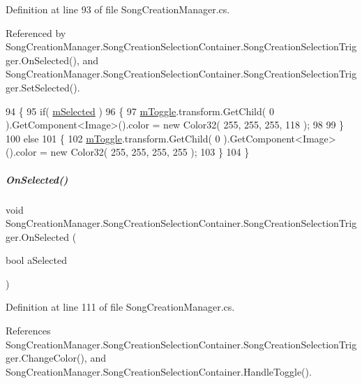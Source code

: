 Definition at line 93 of file Song\+Creation\+Manager.\+cs.



Referenced by Song\+Creation\+Manager.\+Song\+Creation\+Selection\+Container.\+Song\+Creation\+Selection\+Trigger.\+On\+Selected(), and Song\+Creation\+Manager.\+Song\+Creation\+Selection\+Container.\+Song\+Creation\+Selection\+Trigger.\+Set\+Selected().


\begin{DoxyCode}
94             \{
95                 \textcolor{keywordflow}{if}( \hyperlink{group___s_c_m_nest_class_a1a8086defe08acc773bdc9385a9f66d2}{mSelected} )
96                 \{
97                     \hyperlink{group___s_c_m_nest_class_ad548c27e148377da02160715a0aca9ee}{mToggle}.transform.GetChild( 0 ).GetComponent<Image>().color = \textcolor{keyword}{new} Color32( 255, 
      255, 255, 118 );
98 
99                 \}
100                 \textcolor{keywordflow}{else}
101                 \{
102                     \hyperlink{group___s_c_m_nest_class_ad548c27e148377da02160715a0aca9ee}{mToggle}.transform.GetChild( 0 ).GetComponent<Image>().color = \textcolor{keyword}{new} Color32( 255, 
      255, 255, 255 );
103                 \}
104             \}
\end{DoxyCode}
\mbox{\label{group___s_c_m_nest_class_a6477d6c5056af7998063e90e282b67ae}} 
\subparagraph{\texorpdfstring{On\+Selected()}{OnSelected()}}
{\footnotesize\ttfamily void Song\+Creation\+Manager.\+Song\+Creation\+Selection\+Container.\+Song\+Creation\+Selection\+Trigger.\+On\+Selected (\begin{DoxyParamCaption}\item[{bool}]{a\+Selected }\end{DoxyParamCaption})}



Definition at line 111 of file Song\+Creation\+Manager.\+cs.



References Song\+Creation\+Manager.\+Song\+Creation\+Selection\+Container.\+Song\+Creation\+Selection\+Trigger.\+Change\+Color(), and Song\+Creation\+Manager.\+Song\+Creation\+Selection\+Container.\+Handle\+Toggle().




